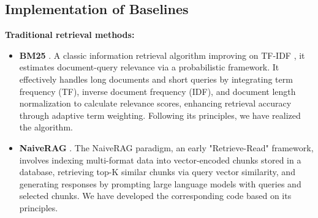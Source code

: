 \subsection{Implementation of Baselines}
\textbf{Traditional retrieval methods:}
\begin{itemize}[leftmargin=*]
\item \textbf{BM25} \cite{BM25}. A classic information retrieval algorithm improving on TF-IDF \cite{TF-IDF}, it estimates document-query relevance via a probabilistic framework. It effectively handles long documents and short queries by integrating term frequency (TF), inverse document frequency (IDF), and document length normalization to calculate relevance scores, enhancing retrieval accuracy through adaptive term weighting. Following its principles, we have realized the algorithm.

\item \textbf{NaiveRAG} \cite{Base2}. The NaiveRAG paradigm, an early "Retrieve-Read" framework, involves indexing multi-format data into vector-encoded chunks stored in a database, retrieving top-K similar chunks via query vector similarity, and generating responses by prompting large language models with queries and selected chunks. We have developed the corresponding code based on its principles.


\end{itemize}

